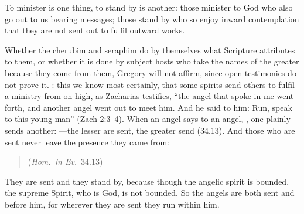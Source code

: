 \noindent To minister is one thing, to stand by is another: those minister
to God who also go out to us bearing messages; those stand by who so enjoy
inward contemplation that they are not sent out to fulfil outward works.

Whether the cherubim and seraphim do by themselves what Scripture attributes
to them, or whether it is done by subject hosts who take the names of the
greater because they come from them, Gregory will not affirm, since open
testimonies do not prove it. : this we know
most certainly, that some spirits send others to fulfil a ministry from on
high, as Zacharias testifies, ``the angel that spoke in me went forth, and
another angel went out to meet him. And he said to him: Run, speak to this
young man'' (Zach 2:3--4). When an angel says to an angel, , one plainly sends another: ---the lesser are sent, the greater send (34.13). And those who
are sent never leave the presence they came from:

\begin{quote}
 (\emph{Hom.\ in
Ev.}\ 34.13)
\end{quote}

\noindent They are sent and they stand by, because though the angelic spirit
is bounded, the supreme Spirit, who is God, is not bounded. So the angels are
both sent and before him, for wherever they are sent they run within him.

